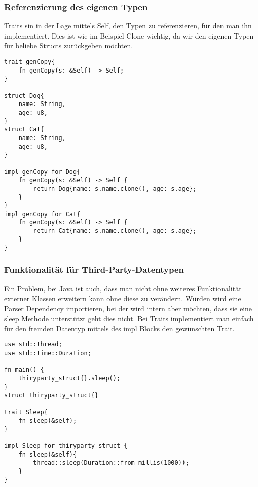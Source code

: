 \documentclass[a4paper, 1ppt]{article}
\begin{document}
\subsubsection{Referenzierung des eigenen Typen}
Traits sin in der Lage mittels Self, den Typen zu referenzieren, für den man ihn implementiert.
Dies ist wie im Beispiel Clone wichtig, da wir den eigenen Typen für beliebe Structs zurückgeben möchten.
\begin{verbatim}
trait genCopy{
    fn genCopy(s: &Self) -> Self;
}

struct Dog{
    name: String,
    age: u8,
}
struct Cat{
    name: String,
    age: u8,
}

impl genCopy for Dog{
    fn genCopy(s: &Self) -> Self {
        return Dog{name: s.name.clone(), age: s.age};
    }
}
impl genCopy for Cat{
    fn genCopy(s: &Self) -> Self {
        return Cat{name: s.name.clone(), age: s.age};
    }
}
\end{verbatim}
\subsubsection{Funktionalität für Third-Party-Datentypen}
Ein Problem, bei Java ist auch, dass man nicht ohne weiteres Funktionalität externer Klassen erweitern kann ohne diese zu verändern.
Würden wird eine Parser Dependency importieren, bei der wird intern aber möchten, dass sie eine sleep Methode unterstützt geht dies nicht.
Bei Traits implementiert man einfach für den fremden Datentyp mittels des impl Blocks den gewünschten Trait.
\begin{verbatim}
use std::thread;
use std::time::Duration;

fn main() {
    thiryparty_struct{}.sleep();
}
struct thiryparty_struct{}

trait Sleep{
    fn sleep(&self);
}

impl Sleep for thiryparty_struct {
    fn sleep(&self){
        thread::sleep(Duration::from_millis(1000));
    }
}
\end{verbatim}
\end{document}
